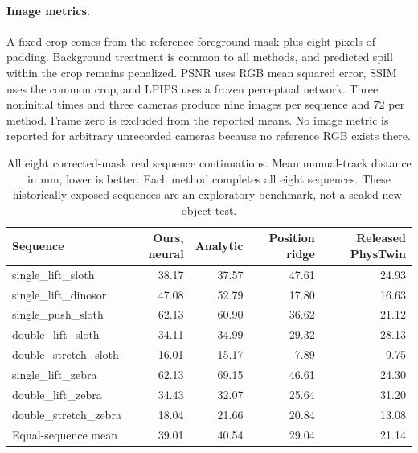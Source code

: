 \documentclass[10pt,twocolumn,letterpaper]{article}
\begin{document}
\paragraph{Image metrics.}
A fixed crop comes from the reference foreground mask plus eight pixels of padding. Background treatment is common to all methods, and predicted spill within the crop remains penalized. PSNR uses RGB mean squared error, SSIM uses the common crop, and LPIPS uses a frozen perceptual network. Three noninitial times and three cameras produce nine images per sequence and 72 per method. Frame zero is excluded from the reported means. No image metric is reported for arbitrary unrecorded cameras because no reference RGB exists there.

\begin{table}[!t]
\centering\small\setlength{\tabcolsep}{3pt}
\caption{All eight corrected-mask real sequence continuations. Mean manual-track distance in mm, lower is better. Each method completes all eight sequences. These historically exposed sequences are an exploratory benchmark, not a sealed new-object test.}
\begin{tabular}{lrrrr}\toprule
Sequence & Ours, neural & Analytic & Position ridge & Released PhysTwin\\\midrule
single\_lift\_sloth & 38.17 & 37.57 & 47.61 & 24.93\\
single\_lift\_dinosor & 47.08 & 52.79 & 17.80 & 16.63\\
single\_push\_sloth & 62.13 & 60.90 & 36.62 & 21.12\\
double\_lift\_sloth & 34.11 & 34.99 & 29.32 & 28.13\\
double\_stretch\_sloth & 16.01 & 15.17 & 7.89 & 9.75\\
single\_lift\_zebra & 62.13 & 69.15 & 46.61 & 24.30\\
double\_lift\_zebra & 34.43 & 32.07 & 25.64 & 31.20\\
double\_stretch\_zebra & 18.04 & 21.66 & 20.84 & 13.08\\
\midrule Equal-sequence mean &39.01&40.54&29.04&21.14\\\bottomrule
\end{tabular}
\end{table}
\end{document}
